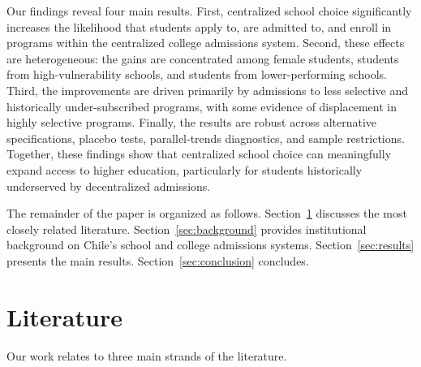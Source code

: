 \documentclass[11pt]{article}
\begin{document}
Our findings reveal four main results. First, centralized school choice significantly increases the likelihood that students apply to, are admitted to, and enroll in programs within the centralized college admissions system. Second, these effects are heterogeneous: the gains are concentrated among female students, students from high-vulnerability schools, and students from lower-performing schools. Third, the improvements are driven primarily by admissions to less selective and historically under-subscribed programs, with some evidence of displacement in highly selective programs. Finally, the results are robust across alternative specifications, placebo tests, parallel-trends diagnostics, and sample restrictions. Together, these findings show that centralized school choice can meaningfully expand access to higher education, particularly for students historically underserved by decentralized admissions.


The remainder of the paper is organized as follows. 
Section~\ref{sec:literature} discusses the most closely related literature. Section~\ref{sec:background} provides institutional background on Chile's school and college admissions systems. Section~\ref{sec:results} presents the main results. Section~\ref{sec:conclusion} concludes.




\section{Literature}\label{sec:literature}
Our work relates to three main strands of the literature.
\end{document}
